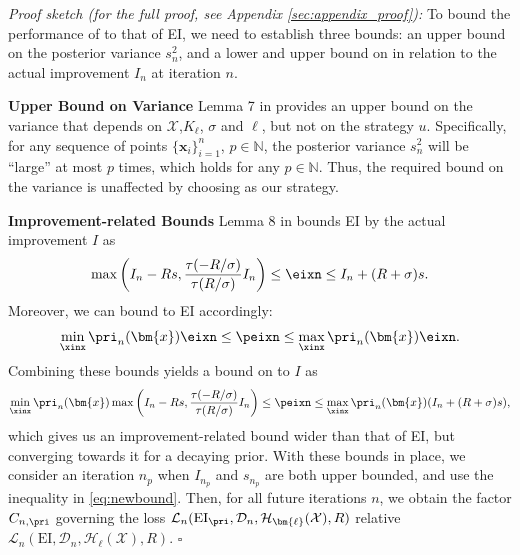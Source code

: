 \textit{Proof sketch (for the full proof, see Appendix \ref{sec:appendix_proof}):} 
To bound the performance of \pei{} to that of EI, we need to establish three bounds: an upper bound on the posterior variance $s_n^2$, and a lower and upper bound on \pei{} in relation to the actual improvement  $I_n$ at iteration $n$. 

\textbf{Upper Bound on Variance}\quad
Lemma 7 in \citet{JMLR:v12:bull11a} provides an upper bound on the variance that depends on $\mathcal{X}$,$K_{\bm{\ell}}$, $\sigma$ and ${\bm{\ell}}$, but not on the strategy $u$. Specifically, for any sequence of points $\{\bm{x}_i\}_{i=1}^n$, $p \in \mathbb{N}$, the posterior variance $s^2_n$ 
will be ``large'' at most $p$ times, which holds for any $p\in \mathbb{N}$. 
Thus, the required bound on the variance is unaffected by choosing \pei{} as our strategy.

\textbf{Improvement-related Bounds}\quad
Lemma 8 in \citet{JMLR:v12:bull11a} bounds EI by the actual improvement $I$ as
\begin{equation}
    \max\left(I_n-Rs, \frac{\tau(-R/\sigma)}{\tau(R/\sigma)}I_n   \right) \leq \eixn \leq I_n + (R + \sigma)s.
\end{equation}
Moreover, we can bound \pei{} to EI accordingly:
\begin{equation}
    {\min_{\xinx}\pri_n(\bm{x})}\eixn \leq \peixn \leq {\max_{\xinx}\pri_n(\bm{x})}\eixn.
\end{equation}
Combining these bounds yields a bound on \pei{} to $I$ as
\begin{equation} \label{eq:newbound}
    {\min_{\xinx}\pri_n(\bm{x})}\max\left(I_n-Rs, \frac{\tau(-R/\sigma)}{\tau(R/\sigma)}I_n\right) \leq \peixn \leq {\max_{\xinx}\pri_n(\bm{x})} (I_n + (R + \sigma)s), 
\end{equation}
which gives us an improvement-related bound wider than that of EI, but converging towards it for a decaying prior. With these bounds in place, we consider an iteration $n_p$ when $I_{n_p}$ and $s_{n_p}$ are both upper bounded, and use the inequality in \eqref{eq:newbound}. Then, for all future iterations $n$, we obtain the factor $C_{n, \pri}$ governing the loss $\mathcal{L}_{n}(\text{EI}_\pri, \mathcal{D}_n, \mathcal{H}_{\bm{\ell}}(\mathcal{X}), R)$ relative $\mathcal{L}_{n}(\text{EI}, \mathcal{D}_n, \mathcal{H}_{\bm{\ell}}(\mathcal{X}), R)$. \hfill$\square$ 





